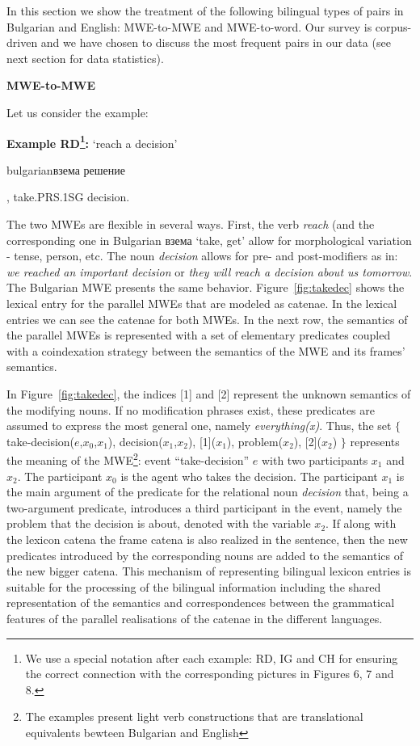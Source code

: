 \documentclass[output=paper]{langsci/langscibook}
\begin{document}
In this section we show the treatment of the following bilingual types of
pairs in Bulgarian and English: MWE-to-MWE and MWE-to-word. Our survey is
corpus-driven and we have chosen to discuss the most frequent pairs in our
data (see next section for data statistics).

\textbf{ MWE-to-MWE}

Let us consider the example:

\textbf{ Example RD\footnote{We use a special notation after each example: RD,
IG and CH for ensuring the correct connection with the corresponding
pictures in Figures
6, 7 and 8.}:} `reach a decision' 
\begin{otherlanguage*}{bulgarian}взема
решение\end{otherlanguage*}, take.\textsc{PRS.1SG} decision.


The two MWEs are flexible in several ways. First, the verb \textit{reach} (and
the corresponding one in Bulgarian взема `take, get' allow for
morphological variation -  tense, person, etc. The noun \textit{decision} allows
for pre- and post-modifiers as in: {\em we reached an important decision} or
{\em they will reach a decision about us tomorrow}. The Bulgarian MWE
presents the same behavior. Figure~\ref{fig:takedec} shows the lexical entry
for the parallel MWEs that are modeled as catenae. In the lexical entries we
can see the catenae for both MWEs. In the next row, the semantics of the
parallel MWEs is represented with a set of elementary predicates coupled
with a coindexation strategy between the semantics of the MWE and its
frames' semantics.

In Figure~\ref{fig:takedec}, the indices [1] and [2] represent the unknown
semantics of the modifying nouns. If no modification phrases exist, these
predicates are assumed to express the most general one, namely {\em
everything(x)}. Thus, the set $\{$take-\linebreak decision($e$,$x_0$,$x_1$),
decision($x_1$,$x_2$), [1]($x_1$), problem($x_2$), [2]($x_2$) $\}$
represents the \linebreak meaning of the  MWE\footnote{The examples present light verb
constructions that are translational equivalents bewteen Bulgarian and
English}: event ``take-decision'' $e$ with two participants $x_1$ and
$x_2$. The participant $x_0$ is the agent who takes the decision. The
participant $x_1$ is the main argument of the predicate for the relational
noun \textit{decision} that, being a two-argument predicate, introduces a third
participant in the event, namely the problem that the decision is about,
denoted with the variable $x_2$. If along with the lexicon catena the frame
catena is also realized in the sentence, then the new predicates introduced
by the corresponding nouns are added to the semantics of the new bigger
catena. This mechanism of representing bilingual lexicon entries is
suitable for the processing of the bilingual information including the
shared representation of the semantics and correspondences between the
grammatical features of the parallel realisations of the catenae in the
different languages.
\end{document}
